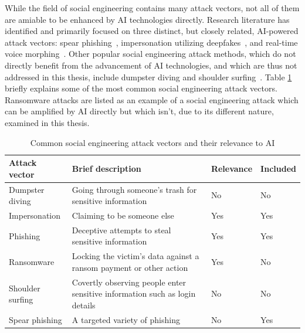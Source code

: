 %
%
While the field of social engineering contains many attack vectors, not all of them are amiable to be enhanced by AI technologies directly. Research literature has identified and primarily focused on three distinct, but closely related, AI-powered attack vectors: spear phishing~\citep{basit_Comprehensive_Survey_AI_Phishing_Detection_2021}, impersonation utilizing deepfakes~\citep{mirsky_Creation_Detection_Deepfakes_2021}, and real-time voice morphing~\citep{doan_BTSE_Audio_Deepfake_Detection_2023}. Other popular social engineering attack methods, which do not directly benefit from the advancement of AI technologies, and which are thus not addressed in this thesis, include dumpster diving and shoulder surfing~\citep{mirsky_Threat_Offensive_AI_Organizations_2023}. Table \ref{table:attacks} briefly explains some of the most common social engineering attack vectors. Ransomware attacks are listed as an example of a social engineering attack which can be amplified by AI directly but which isn’t, due to its different nature, examined in this thesis.

\begin{table}[ht!]  
\centering  
\renewcommand{\arraystretch}{1.5} %
\setlength{\tabcolsep}{5pt} %
\begin{tabularx}{\textwidth}{|l|X|l|l|} %
\hline  
\textbf{Attack vector} & \textbf{Brief description} & \textbf{Relevance} & \textbf{Included} \\ \hline  
Dumpster diving & Going through someone's trash for sensitive information & No & No \\ \hline  
Impersonation & Claiming to be someone else & Yes & Yes \\ \hline  
Phishing & Deceptive attempts to steal sensitive information & Yes & Yes \\ \hline  
Ransomware & Locking the victim's data against a ransom payment or other action & Yes & No \\ \hline  
Shoulder surfing & Covertly observing people enter sensitive information such as login details & No & No \\ \hline  
Spear phishing & A targeted variety of phishing & No & Yes \\ \hline  
\end{tabularx}  
\caption{Common social engineering attack vectors and their relevance to AI}  
\label{table:attacks}  
\end{table} 


